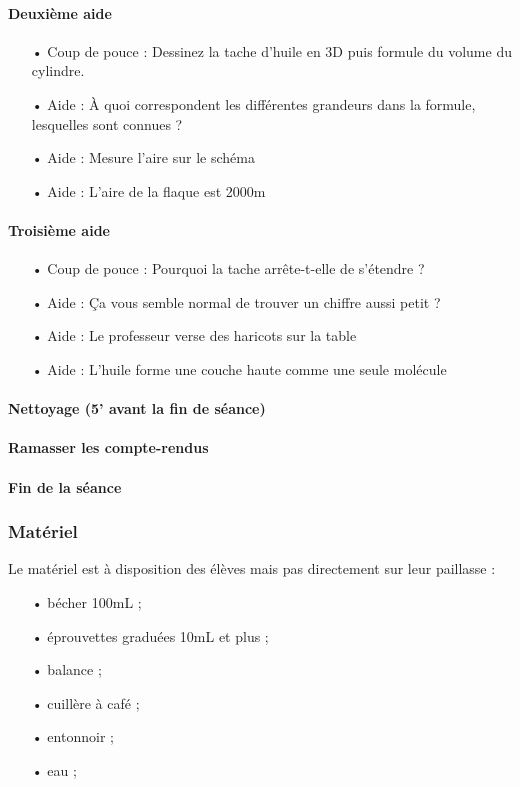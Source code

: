 \documentclass[12pt,a4paper, fleqn]{report}
\begin{document}
\paragraph{Deuxième aide}
\begin{itemize}
\item[•] Coup de pouce : Dessinez la tache d'huile en 3D puis formule du volume du cylindre.
\item[•] Aide : À quoi correspondent les différentes grandeurs dans la formule, lesquelles sont connues ?
\item[•] Aide : Mesure l'aire sur le schéma
\item[•] Aide : L'aire de la flaque est \unit{2000}{m\squared}
\end{itemize}

\paragraph{Troisième aide}
\begin{itemize}
\item[•] Coup de pouce : Pourquoi la tache arrête-t-elle de s'étendre ?
\item[•] Aide : Ça vous semble normal de trouver un chiffre aussi petit ?
\item[•] Aide : Le professeur verse des haricots sur la table
\item[•] Aide : L'huile forme une couche haute comme une seule molécule
\end{itemize}

\paragraph{Nettoyage (5' avant la fin de séance)}

\paragraph{Ramasser les compte-rendus}
 
\paragraph{Fin de la séance}

\subsubsection{Matériel}

Le matériel est à disposition des élèves mais pas directement sur leur paillasse :
\begin{itemize}
\item[•] bécher \unit{100}{mL} ;
\item[•] éprouvettes graduées \unit{10}{mL} et plus ;
\item[•] balance ;
\item[•] cuillère à café ;
\item[•] entonnoir ;
\item[•] eau ;
\end{itemize}
\end{document}
